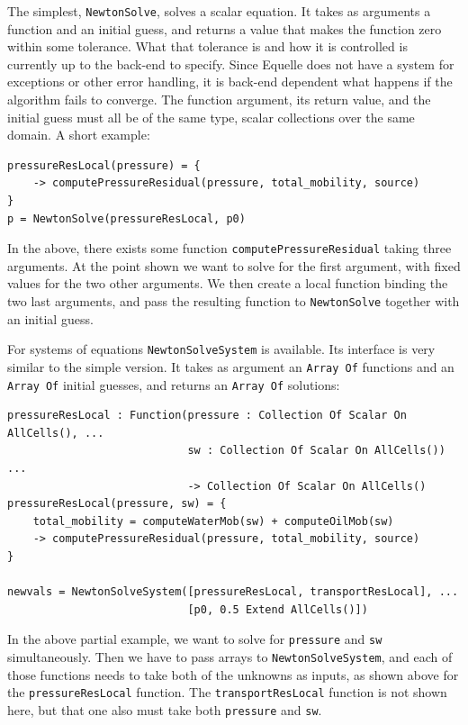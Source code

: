 \documentclass[11pt]{article}
\newcommand{\code}[1]{\texttt{#1}}
\begin{document}
The simplest, \code{NewtonSolve}, solves a scalar equation. It takes as arguments a
function and an initial guess, and returns a value that makes the function zero within
some tolerance. What that tolerance is and how it is controlled is currently up to the
back-end to specify. Since Equelle does not have a system for exceptions or other error
handling, it is back-end dependent what happens if the algorithm fails to converge. The
function argument, its return value, and the initial guess must all be of the same type,
scalar collections over the same domain. A short example:

\begin{verbatim}
pressureResLocal(pressure) = {
    -> computePressureResidual(pressure, total_mobility, source)
}
p = NewtonSolve(pressureResLocal, p0)
\end{verbatim}

In the above, there exists some function \code{computePressureResidual} taking three
arguments. At the point shown we want to solve for the first argument, with fixed values
for the two other arguments. We then create a local function binding the two last
arguments, and pass the resulting function to \code{NewtonSolve} together with an initial
guess.

For systems of equations \code{NewtonSolveSystem} is available. Its interface is very
similar to the simple version. It takes as argument an \code{Array Of} functions and an
\code{Array Of} initial guesses, and returns an \code{Array Of} solutions:

\begin{verbatim}
pressureResLocal : Function(pressure : Collection Of Scalar On AllCells(), ...
                            sw : Collection Of Scalar On AllCells()) ...
                            -> Collection Of Scalar On AllCells()
pressureResLocal(pressure, sw) = {
    total_mobility = computeWaterMob(sw) + computeOilMob(sw)
    -> computePressureResidual(pressure, total_mobility, source)
}

newvals = NewtonSolveSystem([pressureResLocal, transportResLocal], ...
                            [p0, 0.5 Extend AllCells()])
\end{verbatim}

In the above partial example, we want to solve for \code{pressure} and \code{sw}
simultaneously. Then we have to pass arrays to \code{NewtonSolveSystem}, and each of those
functions needs to take both of the unknowns as inputs, as shown above for the
\code{pressureResLocal} function. The \code{transportResLocal} function is not shown here,
but that one also must take both \code{pressure} and \code{sw}.
\end{document}
